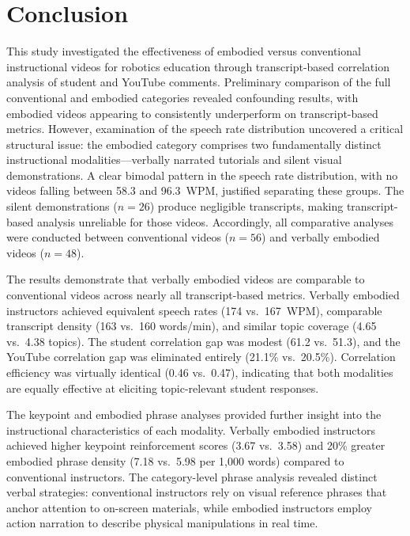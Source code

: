 \section{Conclusion}

This study investigated the effectiveness of embodied versus conventional instructional videos for robotics education through transcript-based correlation analysis of student and YouTube comments. Preliminary comparison of the full conventional and embodied categories revealed confounding results, with embodied videos appearing to consistently underperform on transcript-based metrics. However, examination of the speech rate distribution uncovered a critical structural issue: the embodied category comprises two fundamentally distinct instructional modalities---verbally narrated tutorials and silent visual demonstrations. A clear bimodal pattern in the speech rate distribution, with no videos falling between 58.3 and 96.3~WPM, justified separating these groups. The silent demonstrations ($n = 26$) produce negligible transcripts, making transcript-based analysis unreliable for those videos. Accordingly, all comparative analyses were conducted between conventional videos ($n = 56$) and verbally embodied videos ($n = 48$).

The results demonstrate that verbally embodied videos are comparable to conventional videos across nearly all transcript-based metrics. Verbally embodied instructors achieved equivalent speech rates (174 vs.\ 167~WPM), comparable transcript density (163 vs.\ 160 words/min), and similar topic coverage (4.65 vs.\ 4.38 topics). The student correlation gap was modest (61.2 vs.\ 51.3), and the YouTube correlation gap was eliminated entirely (21.1\% vs.\ 20.5\%). Correlation efficiency was virtually identical (0.46 vs.\ 0.47), indicating that both modalities are equally effective at eliciting topic-relevant student responses.

The keypoint and embodied phrase analyses provided further insight into the instructional characteristics of each modality. Verbally embodied instructors achieved higher keypoint reinforcement scores (3.67 vs.\ 3.58) and 20\% greater embodied phrase density (7.18 vs.\ 5.98 per 1{,}000 words) compared to conventional instructors. The category-level phrase analysis revealed distinct verbal strategies: conventional instructors rely on visual reference phrases that anchor attention to on-screen materials, while embodied instructors employ action narration to describe physical manipulations in real time.

